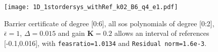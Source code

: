 \begin{figure}[htbp]
\centering
\texttt{[image: 1D\_1stordersys\_withRef\_k02\_B6\_q4\_e1.pdf]}
\caption{Barrier certificate of degree [0:6], all \gls{sos} polynomials of degree [0:2], $\bar{\epsilon}=1$, $\Delta=0.015$ and gain $\textbf{K}=0.2$ allows an interval of references [-0.1,0.016], with \texttt{feasratio=1.0134} and \texttt{Residual norm=1.6e-3}.}
\label{fig:1D_1stordersys_withRef_k02_B6_q4_e1}
\end{figure}


%
%
%
%
